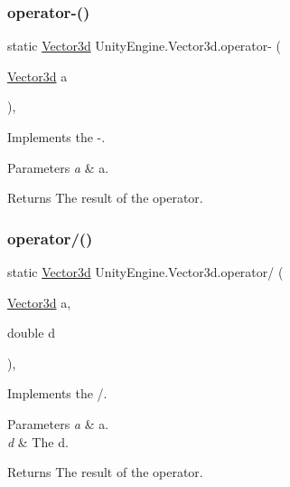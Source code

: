 \subsubsection{\texorpdfstring{operator-\/()}{operator-()}\hspace{0.1cm}{\footnotesize\ttfamily [2/2]}}
{\footnotesize\ttfamily static \hyperlink{struct_unity_engine_1_1_vector3d}{Vector3d} Unity\+Engine.\+Vector3d.\+operator-\/ (\begin{DoxyParamCaption}\item[{\hyperlink{struct_unity_engine_1_1_vector3d}{Vector3d}}]{a }\end{DoxyParamCaption})\hspace{0.3cm}{\ttfamily [inline]}, {\ttfamily [static]}}



Implements the -\/. 


\begin{DoxyParams}{Parameters}
{\em a} & a.\\
\hline
\end{DoxyParams}
\begin{DoxyReturn}{Returns}
The result of the operator.
\end{DoxyReturn}
\mbox{\label{struct_unity_engine_1_1_vector3d_a96ae9471376cf81626241d4634574ebc}} 
\subsubsection{\texorpdfstring{operator/()}{operator/()}}
{\footnotesize\ttfamily static \hyperlink{struct_unity_engine_1_1_vector3d}{Vector3d} Unity\+Engine.\+Vector3d.\+operator/ (\begin{DoxyParamCaption}\item[{\hyperlink{struct_unity_engine_1_1_vector3d}{Vector3d}}]{a,  }\item[{double}]{d }\end{DoxyParamCaption})\hspace{0.3cm}{\ttfamily [inline]}, {\ttfamily [static]}}



Implements the /. 


\begin{DoxyParams}{Parameters}
{\em a} & a.\\
\hline
{\em d} & The d.\\
\hline
\end{DoxyParams}
\begin{DoxyReturn}{Returns}
The result of the operator.
\end{DoxyReturn}
\mbox{\label{struct_unity_engine_1_1_vector3d_a73f60b5dd72497a724606d134c4c9a1a}} 
